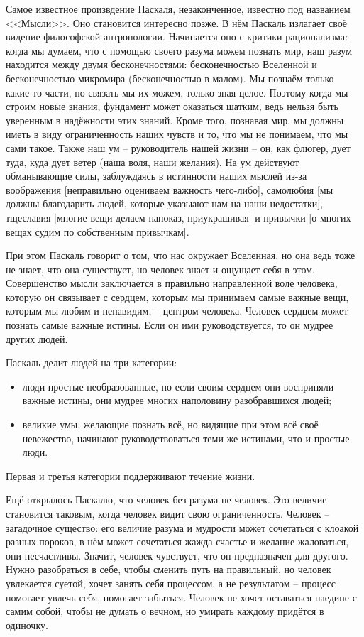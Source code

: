 \documentclass[a4paper, 12pt]{book} %
\begin{document}
Самое известное произвдение Паскаля, незаконченное, известно под названием <<Мысли>>. Оно становится интересно позже. В нём Паскаль излагает своё видение философской антропологии. Начинается оно с критики рационализма: когда мы думаем, что с помощью своего разума можем познать мир, наш разум находится между двумя бесконечностями: бесконечностью Вселенной и бесконечностью микромира (бесконечностью в малом). Мы познаём только какие-то части, но связать мы их можем, только зная целое. Поэтому когда мы строим новые знания, фундамент может оказаться шатким, ведь нельзя быть уверенным в надёжности этих знаний. Кроме того, познавая мир, мы должны иметь в виду ограниченность наших чувств и то, что мы не понимаем, что мы сами такое. Также наш ум -- руководитель нашей жизни -- он, как флюгер, дует туда, куда дует ветер (наша воля, наши желания). На ум действуют обманывающие силы, заблуждаясь в истинности наших мыслей из-за воображения [неправильно оцениваем важность чего-либо], самолюбия [мы должны благодарить людей, которые указыают нам на наши недостатки], тщеславия [многие вещи делаем напоказ, приукрашивая] и привычки [о многих вещах судим по собственным привычкам].

При этом Паскаль говорит о том, что нас окружает Вселенная, но она ведь тоже не знает, что она существует, но человек знает и ощущает себя в этом. Совершенство мысли заключается в правильно направленной воле человека, которую он связывает с сердцем, которым мы принимаем самые важные вещи, которым мы любим и ненавидим, -- центром человека. Человек сердцем может познать самые важные истины. Если он ими руководствуется, то он мудрее других людей.

Паскаль делит людей на три категории:
\begin{itemize}
\item люди простые необразованные, но если своим сердцем они восприняли важные истины, они мудрее многих наполовину разобравшихся людей;
\item великие умы, желающие познать всё, но видящие при этом всё своё невежество, начинают руководствоваться теми же истинами, что и простые люди.
\end{itemize}
Первая и третья категории поддерживают течение жизни.

Ещё открылось Паскалю, что человек без разума не человек. Это величие становится таковым, когда человек видит свою ограниченность. Человек -- загадочное существо: его величие разума и мудрости может сочетаться с клоакой разных пороков, в нём может сочетаться жажда счастье и желание жаловаться, они несчастливы. Значит, человек чувствует, что он предназначен для другого. Нужно разобраться в себе, чтобы сменить путь на правильный, но человек увлекается суетой, хочет занять себя процессом, а не результатом -- процесс помогает увлечь себя, помогает забыться. Человек не хочет оставаться наедине с самим собой, чтобы не думать о вечном, но умирать каждому придётся в одиночку. 
\end{document}
